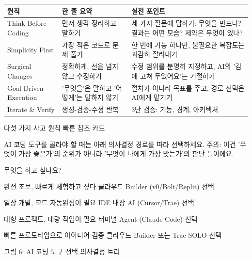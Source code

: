


\begin{center}
\begin{tabularx}{\linewidth}{|X|X|X|}
\hline
\textbf{원칙} & \textbf{한 줄 요약} & \textbf{실천 포인트} \tabularnewline
\hline
Think Before Coding & 먼저 생각 정리하고 말하기 & 세 가지 질문에 답하기: 무엇을 만드나? 결과는 어떤 모습? 제약은 무엇이 있나? \tabularnewline
Simplicity First & 가장 적은 코드로 문제 풀기 & 한 번에 기능 하나만, 불필요한 복잡도는 과감히 잘라내기 \tabularnewline
Surgical Changes & 정확하게, 선을 넘지 않고 수정하기 & 수정 범위를 분명히 지정하고, AI의 '김에 고쳐 두었어요'는 거절하기 \tabularnewline
Goal-Driven Execution & '무엇을'은 말하고 '어떻게'는 말하지 않기 & 절차가 아니라 목표를 주고, 경로 선택은 AI에게 맡기기 \tabularnewline
Iterate \& Verify & 생성-검증-수정 반복 & 3단 검증: 기능, 경계, 아키텍처 \tabularnewline
\hline
\end{tabularx}
\end{center}

\begin{center}\small\color{gray}다섯 가지 사고 원칙 빠른 참조 카드\end{center}


AI 코딩 도구를 골라야 할 때는 아래 의사결정 경로를 따라 선택하세요. 주의: 이건 '무엇이 가장 좋은가'의 순위가 아니라 '무엇이 나에게 가장 맞는가'의 판단 틀이에요.

무엇을 하고 싶나요?

완전 초보, 빠르게 체험하고 싶다 클라우드 Builder (v0/Bolt/Replit) 선택

일상 개발, 코드 자동완성이 필요 IDE 내장 AI (Cursor/Trae) 선택

대형 프로젝트, 대량 작업이 필요 터미널 Agent (Claude Code) 선택

빠른 프로토타입으로 아이디어 검증 클라우드 Builder 또는 Trae SOLO 선택

\begin{center}\small\color{gray}그림 6: AI 코딩 도구 선택 의사결정 트리\end{center}


